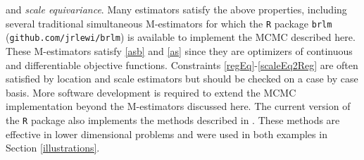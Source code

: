 \documentclass[ba]{imsart}
\makeatletter
\def\bbeta{\mbox{\boldmath $\beta$}}
\newcommand{\by}{\mbox{\boldmath $y$}}
\newcommand{\bv}{\mbox{\boldmath $v$}}
\newcommand{\bb}{\mbox{\boldmath $b$}}
\newcommand{\response}[1]{{\color{blue}#1}}
\newcommand{\labitem}[2]{%
\def\@itemlabel{\textbf{#1}{.}}
\item
\def\@currentlabel{#1}\label{#2}}
\makeatother
\begin{document}
and \textit{scale equivariance}. 
Many estimators satisfy the above properties, including several traditional simultaneous M-estimators \citep{huber2009, maronna2006} for which the \texttt{R} package \texttt{brlm} (\texttt{github.com/jrlewi/brlm}) is available to implement the MCMC described here. 
These M-estimators satisfy \ref{asb} and \ref{as} since they are optimizers of continuous and differentiable objective functions. Constraints \ref{regEq}-\ref{scaleEq2Reg} are often satisfied by location and scale estimators but should be checked on a case by case basis. 
More software development is required to extend the MCMC implementation beyond the M-estimators discussed here. The current version of the \texttt{R} package also implements the  methods described in \cite{lewis2014}. These methods are effective in lower dimensional problems and were used in both examples in Section \ref{illustrations}.

\end{document}
